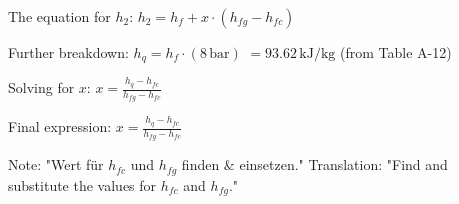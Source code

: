The equation for \( h_2 \):  
\( h_2 = h_f + x \cdot (h_{fg} - h_{fc}) \)  

Further breakdown:  
\( h_q = h_f \cdot (8 \, \text{bar}) \)  
\( = 93.62 \, \text{kJ/kg} \) (from Table A-12)  

Solving for \( x \):  
\( x = \frac{h_q - h_{fc}}{h_{fg} - h_{fc}} \)  

Final expression:  
\( x = \frac{h_q - h_{fc}}{h_{fg} - h_{fc}} \)  

Note: "Wert für \( h_{fc} \) und \( h_{fg} \) finden & einsetzen."  
Translation: "Find and substitute the values for \( h_{fc} \) and \( h_{fg} \)."